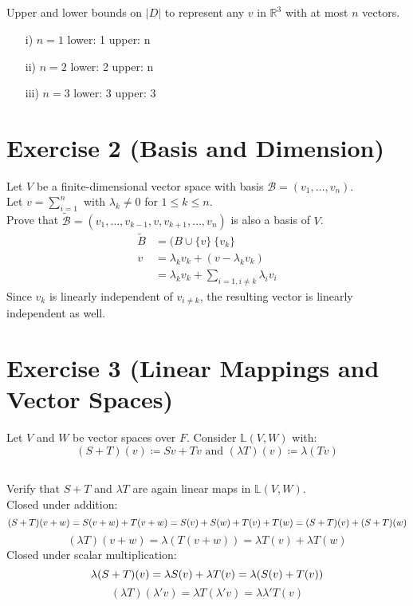\documentclass[10pt]{article}
\numberwithin{equation}{section}
\begin{document}
\subsection{}
Upper and lower bounds on $|D|$ to represent any $v$ in $\mathbb{R}^3$ with at most $n$ vectors.
\begin{enumerate}
  \item[i)]{$n=1$ lower: 1 upper: n}
  \item[ii)]{$n=2$ lower: 2 upper: n}
  \item[iii)]{$n=3$ lower: 3 upper: 3}
\end{enumerate}

\section{Exercise 2 (Basis and Dimension)}
Let $V$ be a finite-dimensional vector space with basis $\mathcal{B} = (v_1,\dots, v_n)$.\\
Let $v = \sum_{i=1}^n$ with $\lambda_k \neq 0$ for $1 \leq k \leq n$.\\
Prove that $\tilde{\mathcal{B}} = (v_1, \dots, v_{k-1}, v, v_{k+1}, \dots, v_n ) $ is also a basis of $V$.
\begin{align*}
  \tilde{B} &= (B \cup \{v\} \ \{v_k\}\\
  v &= \lambda_k v_k + (v-\lambda_k v_k )\\
    &= \lambda_k v_k + \sum_{i=1, i\neq k} \lambda_i v_i
\end{align*}
Since $v_k$ is linearly independent of $v_{i\neq k}$, the resulting vector is linearly independent as well.

\section{Exercise 3 (Linear Mappings and Vector Spaces)}
Let $V$ and $W$ be vector spaces over $F$. Consider $\mathbb{L}(V,W)$ with:
$$ (S+T)(v) \coloneq Sv + Tv \text{ and } (\lambda T)(v) \coloneq \lambda(Tv) $$

\subsection{}
Verify that $S +T$ and $\lambda T$ are again linear maps in $\mathbb{L}(V,W)$.\\
Closed under addition:
$$
(S+T)(v + w) = S(v + w) + T(v + w) = S(v) + S(w) + T(v) + T(w) = (S+T)(v) + (S+T)(w)\\
$$
$$
(\lambda T)(v + w) = \lambda (T(v + w)) = \lambda T(v) + \lambda T(w)
$$
Closed under scalar multiplication:
$$
\lambda (S+T)(v) = \lambda S(v) + \lambda T(v) = \lambda (S(v) + T(v))\\
$$
$$
(\lambda T)(\lambda' v) = \lambda T(\lambda' v) = \lambda \lambda' T(v)
$$
\end{document}
